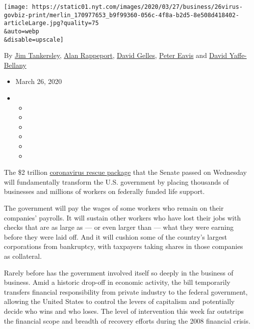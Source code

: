 \texttt{[image: https://static01.nyt.com/images/2020/03/27/business/26virus-govbiz-print/merlin\_170977653\_b9f99360-056c-4f8a-b2d5-8e508d418402-articleLarge.jpg?quality=75\\\&auto=webp\\\&disable=upscale]}

By \href{https://www.nytimes.com/by/jim-tankersley}{Jim Tankersley},
\href{https://www.nytimes.com/by/alan-rappeport}{Alan Rappeport},
\href{https://www.nytimes.com/by/david-gelles}{David Gelles},
\href{https://www.nytimes.com/by/peter-eavis}{Peter Eavis} and
\href{http://www.nytimes.com/by/david-yaffe-bellany}{David
Yaffe-Bellany}

\begin{itemize}
\item
  March 26, 2020
\item
  \begin{itemize}
  \item
  \item
  \item
  \item
  \item
  \item
  \end{itemize}
\end{itemize}

The \$2 trillion
\href{https://www.nytimes.com/2020/07/28/us/politics/coronavirus-relief-bills-house-senate.html}{coronavirus
rescue package} that the Senate passed on Wednesday will fundamentally
transform the U.S. government by placing thousands of businesses and
millions of workers on federally funded life support.

The government will pay the wages of some workers who remain on their
companies' payrolls. It will sustain other workers who have lost their
jobs with checks that are as large as --- or even larger than --- what
they were earning before they were laid off. And it will cushion some of
the country's largest corporations from bankruptcy, with taxpayers
taking shares in those companies as collateral.

Rarely before has the government involved itself so deeply in the
business of business. Amid a historic drop-off in economic activity, the
bill temporarily transfers financial responsibility from private
industry to the federal government, allowing the United States to
control the levers of capitalism and potentially decide who wins and who
loses. The level of intervention this week far outstrips the financial
scope and breadth of recovery efforts during the 2008 financial crisis.

